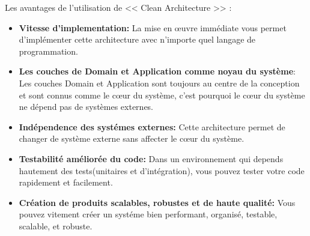 \noindent
Les avantages de l’utilisation de  << Clean Architecture >> :

\begin{itemize}[label={---}]
    \item \small\textbf{Vitesse d'implementation: } La mise en œuvre immédiate vous permet d'implémenter cette architecture avec n'importe quel langage de programmation.

    \item \small\textbf{Les couches de Domain et Application comme noyau du système}: Les couches Domain et Application sont toujours au centre de la conception et sont connus comme le cœur du système, c'est pourquoi le cœur du système ne dépend pas de systèmes externes. 

    \item \small\textbf{Indépendence des systémes externes: } Cette architecture permet de changer de système externe sans affecter le cœur du système.

    \item \small\textbf{Testabilité améliorée du code: } Dans un environnement qui depends hautement des tests(unitaires et d'intégration), vous pouvez tester votre code rapidement et facilement.    

    \item \small\textbf{Création de produits scalables, robustes et de haute qualité: } Vous pouvez vitement créer un systéme bien performant, organisé, testable, scalable, et robuste.
\end{itemize}
\noindent